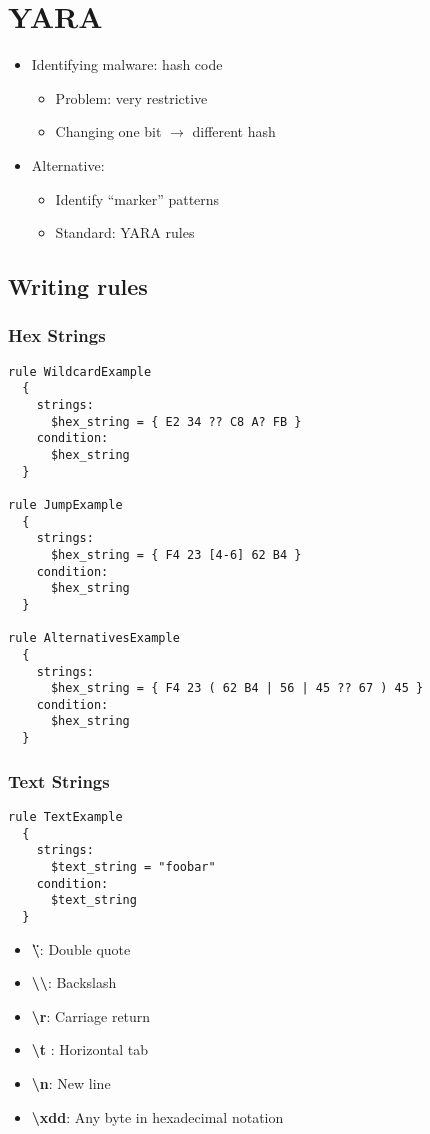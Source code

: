 \section{YARA}
\begin{itemize}
  \item Identifying malware: hash code
  \begin{itemize}
    \item Problem: very restrictive
    \item Changing one bit $\rightarrow$ different hash
  \end{itemize}
  \item Alternative:
  \begin{itemize}
    \item Identify ``marker'' patterns
    \item Standard: YARA rules
  \end{itemize}
\end{itemize}

\subsection{Writing rules}
\subsubsection{Hex Strings}
\begin{lstlisting}
rule WildcardExample
  {
    strings:
      $hex_string = { E2 34 ?? C8 A? FB }
    condition:
      $hex_string
  }

rule JumpExample
  {
    strings:
      $hex_string = { F4 23 [4-6] 62 B4 }
    condition:
      $hex_string
  }

rule AlternativesExample
  {
    strings:
      $hex_string = { F4 23 ( 62 B4 | 56 | 45 ?? 67 ) 45 }
    condition:
      $hex_string
  }
\end{lstlisting}

\subsubsection{Text Strings}
\begin{lstlisting}
rule TextExample
  {
    strings:
      $text_string = "foobar"
    condition:
      $text_string
  }
\end{lstlisting}
\begin{itemize}
  \item \textbf{\textbackslash \"}: Double quote
  \item \textbf{\textbackslash \textbackslash}: Backslash
  \item \textbf{\textbackslash r}: Carriage return
  \item \textbf{\textbackslash t }: Horizontal tab
  \item \textbf{\textbackslash n}: New line
  \item \textbf{\textbackslash xdd}: Any byte in hexadecimal notation
\end{itemize}

